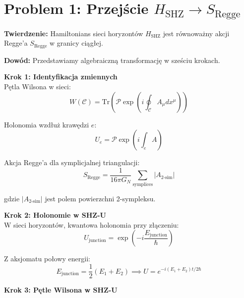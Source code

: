 \documentclass[11pt,a4paper]{article}
\begin{document}
\bigskip
\section{Problem 1: Przejście $H_{\text{SHZ}} \to S_{\text{Regge}}$}

\bigskip

\textbf{Twierdzenie:} Hamiltonians sieci horyzontów $H_{\text{SHZ}}$ jest równoważny akcji Regge'a $S_{\text{Regge}}$ w granicy ciągłej.

\bigskip

\textbf{Dowód:} Przedstawiamy algebraiczną transformację w sześciu krokach.

\bigskip

\textbf{Krok 1: Identyfikacja zmiennych}\\

Pętla Wilsona w sieci:
\begin{equation}
W(\mathcal{C}) = \text{Tr} \left( \mathcal{P} \exp\left( i \oint_{\mathcal{C}} A_\mu dx^\mu \right) \right)
\end{equation}

Holonomia wzdłuż krawędzi $e$:
\begin{equation}
U_e = \mathcal{P} \exp\left( i \int_e A \right)
\end{equation}

Akcja Regge'a dla symplicjalnej triangulacji:
\begin{equation}
S_{\text{Regge}} = \frac{1}{16\pi G_N} \sum_{\text{symplices}} |A_{\text{2-sim}}|
\end{equation}

gdzie $|A_{\text{2-sim}}|$ jest polem powierzchni 2-sympleksu.

\bigskip

\textbf{Krok 2: Holonomie w SHZ-U}\\

W sieci horyzontów, kwantowa holonomia przy złączeniu:
\begin{equation}
U_{\text{junction}} = \exp\left( -i \frac{E_{\text{junction}}}{\hbar} \right)
\end{equation}

Z aksjomatu połowy energii:
\begin{equation}
E_{\text{junction}} = \frac{1}{2}(E_1 + E_2) \implies U = e^{-i(E_1 + E_2)t/2\hbar}
\end{equation}

\bigskip

\textbf{Krok 3: Pętle Wilsona w SHZ-U}\\
\end{document}
